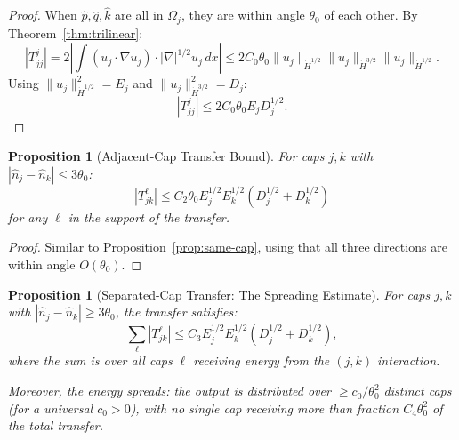 \documentclass[11pt]{article}
\newtheorem{proposition}[theorem]{Proposition}
\theoremstyle{definition}
\begin{document}
\begin{proof}
When $\hat{p}, \hat{q}, \hat{k}$ are all in $\Omega_j$, they are within angle $\theta_0$ of each other. By Theorem~\ref{thm:trilinear}:
\begin{equation}
|T_{jj}^j| = 2\left|\int (u_j \cdot \nabla u_j) \cdot |\nabla|^{1/2} u_j \, dx\right| \leq 2C_0 \theta_0 \|u_j\|_{\dot{H}^{1/2}} \|u_j\|_{\dot{H}^{3/2}} \|u_j\|_{\dot{H}^{1/2}}.
\end{equation}
Using $\|u_j\|_{\dot{H}^{1/2}}^2 = E_j$ and $\|u_j\|_{\dot{H}^{3/2}}^2 = D_j$:
\begin{equation}
|T_{jj}^j| \leq 2C_0 \theta_0 E_j D_j^{1/2}.
\end{equation}
\end{proof}

\begin{proposition}[Adjacent-Cap Transfer Bound]\label{prop:adj-cap}
For caps $j, k$ with $|\hat{n}_j - \hat{n}_k| \leq 3\theta_0$:
\begin{equation}
|T_{jk}^\ell| \leq C_2 \theta_0 E_j^{1/2} E_k^{1/2} (D_j^{1/2} + D_k^{1/2})
\end{equation}
for any $\ell$ in the support of the transfer.
\end{proposition}

\begin{proof}
Similar to Proposition~\ref{prop:same-cap}, using that all three directions are within angle $O(\theta_0)$.
\end{proof}

\begin{proposition}[Separated-Cap Transfer: The Spreading Estimate]\label{prop:sep-cap}
For caps $j, k$ with $|\hat{n}_j - \hat{n}_k| \geq 3\theta_0$, the transfer satisfies:
\begin{equation}\label{eq:spreading}
\sum_{\ell} |T_{jk}^\ell| \leq C_3 E_j^{1/2} E_k^{1/2} (D_j^{1/2} + D_k^{1/2}),
\end{equation}
where the sum is over all caps $\ell$ receiving energy from the $(j,k)$ interaction.

Moreover, the energy spreads: the output is distributed over $\geq c_0/\theta_0^2$ distinct caps (for a universal $c_0 > 0$), with no single cap receiving more than fraction $C_4 \theta_0^2$ of the total transfer.
\end{proposition}
\end{document}
